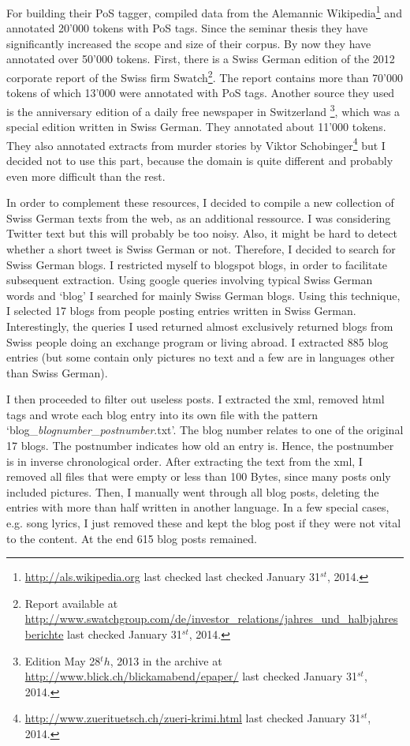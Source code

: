 \documentclass[11pt,letterpaper, covington]{article}
\begin{document}
For building their PoS tagger, \citet{AH12} compiled data from the Alemannic Wikipedia\footnote{\url{http://als.wikipedia.org} last checked last checked January 31$^{st}$, 2014.} and annotated 20'000 tokens with PoS tags. Since the seminar thesis they have significantly increased the scope and size of their corpus. By now they have annotated over 50'000 tokens. First, there is a Swiss German edition of the 2012 corporate report of the Swiss firm Swatch\footnote{Report available at \url{http://www.swatchgroup.com/de/investor_relations/jahres_und_halbjahresberichte} last checked January 31$^{st}$, 2014.}. The report contains more than 70'000 tokens of which 13'000 were annotated with PoS tags. Another source they used is the anniversary edition of a daily free newspaper in Switzerland \footnote{Edition May 28$^th$, 2013 in the archive at \url{http://www.blick.ch/blickamabend/epaper/}  last checked January 31$^{st}$, 2014.}, which was a special edition written in Swiss German. They annotated about 11'000 tokens. They also annotated extracts from murder stories by Viktor Schobinger\footnote{\url{http://www.zuerituetsch.ch/zueri-krimi.html}  last checked January 31$^{st}$, 2014.} but I decided not to use this part, because the domain is quite different and probably even more difficult than the rest. \citep{AH14}

In order to complement these resources, I decided to compile a new collection of Swiss German texts from the web, as an additional ressource. I was considering Twitter text but this will probably be too noisy. Also, it might be hard to detect whether a short tweet is Swiss German or not. Therefore, I decided to search for Swiss German blogs. I restricted myself to blogspot blogs, in order to facilitate subsequent extraction. Using google queries involving typical Swiss German words and `blog' I searched for mainly Swiss German blogs. Using this technique, I selected 17 blogs from people posting entries written in Swiss German. Interestingly, the queries I used returned almost exclusively returned blogs from Swiss people doing an exchange program or living abroad. I extracted 885 blog entries (but some contain only pictures no text and a few are in languages other than Swiss German). 

I then proceeded to filter out useless posts. I extracted the xml, removed html tags and wrote each blog entry into its own file with the pattern `blog\_\emph{blognumber}\_\emph{postnumber}.txt'. The blog number relates to one of the original 17 blogs. The postnumber indicates how old an entry is. Hence, the postnumber is in inverse chronological order. After extracting the text from the xml, I removed all files that were empty or less than 100 Bytes, since many posts only included pictures. Then, I manually went through all blog posts, deleting the entries with more than half written in another language. In a few special cases, e.g. song lyrics, I just removed these and kept the blog post if they were not vital to the content. At the end 615 blog posts remained.
\end{document}
